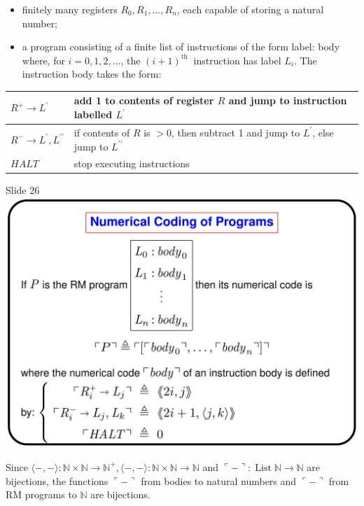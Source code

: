 \documentclass[10pt]{article}
\begin{document}
\begin{itemize}
  \item finitely many registers $R_{0}, R_{1}, \ldots, R_{n}$, each capable of storing a natural number;
  \item a program consisting of a finite list of instructions of the form label: body where, for $i=0,1,2, \ldots$, the $(i+1)^{\text {th }}$ instruction has label $L_{i}$. The instruction body takes the form:
\end{itemize}

\begin{center}
\begin{tabular}{|ll|}
\hline
$R^{+} \rightarrow L^{\prime}$ & add 1 to contents of register $R$ and jump to instruction labelled $L^{\prime}$ \\
\hline
$R^{-} \rightarrow L^{\prime}, L^{\prime \prime}$ & if contents of $R$ is $>0$, then subtract 1 and jump to $L^{\prime}$, else jump to $L^{\prime \prime}$ \\
\hline
$H A L T$ & stop executing instructions \\
\hline
\end{tabular}
\end{center}

Slide 26\\
\includegraphics[max width=\textwidth, center]{2025_05_09_e840a83aab7eebacdc7fg-20}

Since $\langle-,-\rangle: \mathbb{N} \times \mathbb{N} \rightarrow \mathbb{N}^{+},\langle-,-\rangle: \mathbb{N} \times \mathbb{N} \rightarrow \mathbb{N}$ and $\ulcorner-\urcorner: \operatorname{List} \mathbb{N} \rightarrow \mathbb{N}$ are bijections, the functions $\ulcorner-\urcorner$ from bodies to natural numbers and $\ulcorner-\urcorner$ from RM programs to $\mathbb{N}$ are bijections.
\end{document}
